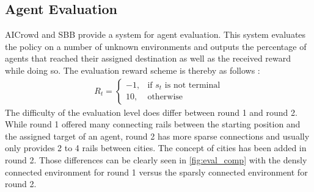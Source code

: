 \subsection*{Agent Evaluation}\label{rl_agent_eval}
AICrowd and SBB provide a system for agent evaluation. This system evaluates the policy on a number of unknown environments and outputs the percentage of agents that reached their assigned destination as well as the received reward while doing so. The evaluation reward scheme is thereby as follows \cite{flatland_faq}:
\begin{gather*}
R_{t}= 
\begin{cases}
-1,				& \text{if } s_{t} \text{ is not terminal}\\
10,             & \text{otherwise}
\end{cases}
\end{gather*}
The difficulty of the evaluation level does differ between round 1 and round 2. While round 1 offered many connecting rails between the starting position and the assigned target of an agent, round 2 has more sparse connections and usually only provides 2 to 4 rails between cities. The concept of cities has been added in round 2. Those differences can be clearly seen in \autoref{fig:eval_comp} with the densly connected environment for round 1 versus the sparsly connected environment for round 2. 
